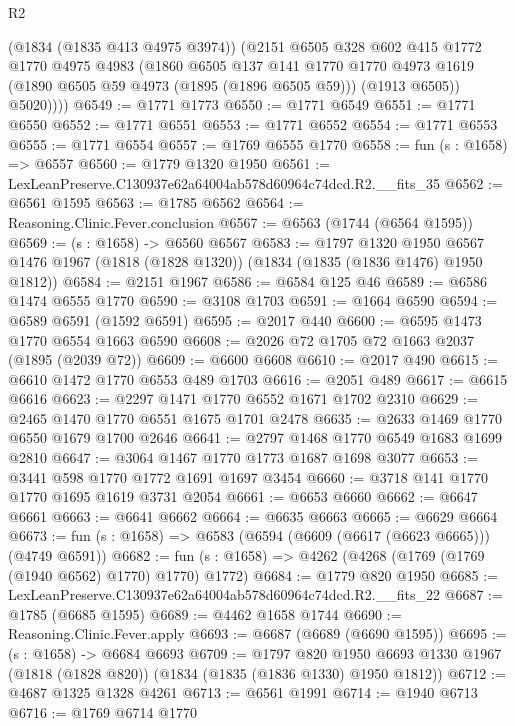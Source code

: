 \begin{lexlean}{R2}
\begin{coremodule}
          (@1834 (@1835 @413 @4975 @3974))
          (@2151
            @6505
            @328
            @602
            @415
            @1772
            @1770
            @4975
            @4983
            (@1860
              @6505
              @137
              @141
              @1770
              @1770
              @4973
              @1619
              (@1890 @6505 @59 @4973 (@1895 (@1896 @6505 @59)))
              (@1913 @6505))
            @5020))))
@6549 := @1771 @1773
@6550 := @1771 @6549
@6551 := @1771 @6550
@6552 := @1771 @6551
@6553 := @1771 @6552
@6554 := @1771 @6553
@6555 := @1771 @6554
@6557 := @1769 @6555 @1770
@6558 := fun (s : @1658) => @6557
@6560 := @1779 @1320 @1950
@6561 := LexLeanPreserve.C130937e62a64004ab578d60964c74dcd.R2.__fits_35
@6562 := @6561 @1595
@6563 := @1785 @6562
@6564 := Reasoning.Clinic.Fever.conclusion
@6567 := @6563 (@1744 (@6564 @1595))
@6569 := (s : @1658) -> @6560 @6567
@6583 := @1797
    @1320
    @1950
    @6567
    @1476
    @1967
    (@1818 (@1828 @1320))
    (@1834 (@1835 (@1836 @1476) @1950 @1812))
@6584 := @2151 @1967
@6586 := @6584 @125 @46
@6589 := @6586 @1474 @6555 @1770
@6590 := @3108 @1703
@6591 := @1664 @6590
@6594 := @6589 @6591 (@1592 @6591)
@6595 := @2017 @440
@6600 := @6595 @1473 @1770 @6554 @1663 @6590
@6608 := @2026 @72 @1705 @72 @1663 @2037 (@1895 (@2039 @72))
@6609 := @6600 @6608
@6610 := @2017 @490
@6615 := @6610 @1472 @1770 @6553 @489 @1703
@6616 := @2051 @489
@6617 := @6615 @6616
@6623 := @2297 @1471 @1770 @6552 @1671 @1702 @2310
@6629 := @2465 @1470 @1770 @6551 @1675 @1701 @2478
@6635 := @2633 @1469 @1770 @6550 @1679 @1700 @2646
@6641 := @2797 @1468 @1770 @6549 @1683 @1699 @2810
@6647 := @3064 @1467 @1770 @1773 @1687 @1698 @3077
@6653 := @3441 @598 @1770 @1772 @1691 @1697 @3454
@6660 := @3718 @141 @1770 @1770 @1695 @1619 @3731 @2054
@6661 := @6653 @6660
@6662 := @6647 @6661
@6663 := @6641 @6662
@6664 := @6635 @6663
@6665 := @6629 @6664
@6673 := fun (s : @1658) => @6583 (@6594 (@6609 (@6617 (@6623 @6665))) (@4749 @6591))
@6682 := fun (s : @1658) => @4262 (@4268 (@1769 (@1769 (@1940 @6562) @1770) @1770) @1772)
@6684 := @1779 @820 @1950
@6685 := LexLeanPreserve.C130937e62a64004ab578d60964c74dcd.R2.__fits_22
@6687 := @1785 (@6685 @1595)
@6689 := @4462 @1658 @1744
@6690 := Reasoning.Clinic.Fever.apply
@6693 := @6687 (@6689 (@6690 @1595))
@6695 := (s : @1658) -> @6684 @6693
@6709 := @1797
    @820
    @1950
    @6693
    @1330
    @1967
    (@1818 (@1828 @820))
    (@1834 (@1835 (@1836 @1330) @1950 @1812))
@6712 := @4687 @1325 @1328 @4261
@6713 := @6561 @1991
@6714 := @1940 @6713
@6716 := @1769 @6714 @1770

\end{coremodule}
\end{lexlean}
